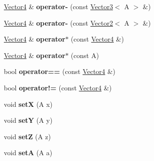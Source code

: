 \begin{DoxyCompactItemize}
\item 
\hypertarget{classVector4_a1d7981b5f26f565419563c13ff373b8f}{}\hyperlink{classVector4}{Vector4} \& {\bfseries operator-\/} (const \hyperlink{classVector3}{Vector3}$<$ A $>$ \&)\label{classVector4_a1d7981b5f26f565419563c13ff373b8f}

\item 
\hypertarget{classVector4_a98bc1591185fb443b9367415122960f0}{}\hyperlink{classVector4}{Vector4} \& {\bfseries operator-\/} (const \hyperlink{classVector2}{Vector2}$<$ A $>$ \&)\label{classVector4_a98bc1591185fb443b9367415122960f0}

\item 
\hypertarget{classVector4_ae2c855062db0aea9917d918376528179}{}\hyperlink{classVector4}{Vector4} \& {\bfseries operator$\ast$} (const \hyperlink{classVector4}{Vector4} \&)\label{classVector4_ae2c855062db0aea9917d918376528179}

\item 
\hypertarget{classVector4_acd81f6ba86632ff32ded8dd5ba406e1b}{}\hyperlink{classVector4}{Vector4} \& {\bfseries operator$\ast$} (const A)\label{classVector4_acd81f6ba86632ff32ded8dd5ba406e1b}

\item 
\hypertarget{classVector4_a86d0fe14ddc5755640ea418e99d45199}{}bool {\bfseries operator==} (const \hyperlink{classVector4}{Vector4} \&)\label{classVector4_a86d0fe14ddc5755640ea418e99d45199}

\item 
\hypertarget{classVector4_a6682f947acaf9501e8f24997937cf3b6}{}bool {\bfseries operator!=} (const \hyperlink{classVector4}{Vector4} \&)\label{classVector4_a6682f947acaf9501e8f24997937cf3b6}

\item 
\hypertarget{classVector4_a0a8d86d0f9f0bfe12b69791915730964}{}void {\bfseries set\+X} (A x)\label{classVector4_a0a8d86d0f9f0bfe12b69791915730964}

\item 
\hypertarget{classVector4_a1888b0350ffe5b85cb16845800665009}{}void {\bfseries set\+Y} (A y)\label{classVector4_a1888b0350ffe5b85cb16845800665009}

\item 
\hypertarget{classVector4_afa4e94fd6a3da582184e549ceb4d8dfa}{}void {\bfseries set\+Z} (A z)\label{classVector4_afa4e94fd6a3da582184e549ceb4d8dfa}

\item 
\hypertarget{classVector4_ab43f17349db80cf50d1198602275f914}{}void {\bfseries set\+A} (A a)\label{classVector4_ab43f17349db80cf50d1198602275f914}


\end{DoxyCompactItemize}
